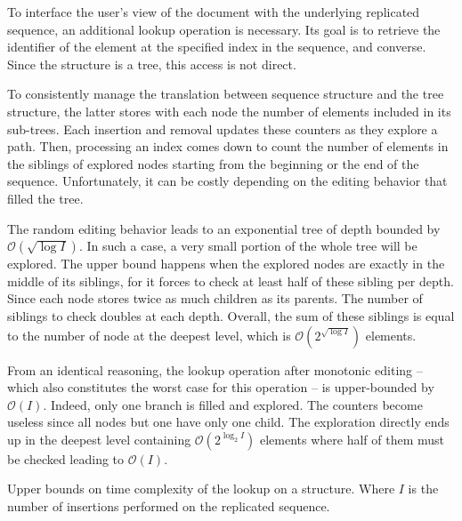 To interface the user's view of the document with the underlying replicated
sequence, an additional lookup operation is necessary. Its goal is to retrieve
the identifier of the element at the specified index in the sequence, and
converse. Since the structure is a tree, this access is not direct.

To consistently manage the translation between sequence structure and the tree
structure, the latter stores with each node the number of elements included in
its sub-trees. Each insertion and removal updates these counters as they explore
a path. Then, processing an index comes down to count the number of elements in
the siblings of explored nodes starting from the beginning or the end of the
sequence. Unfortunately, it can be costly depending on the editing behavior that
filled the tree.

The random editing behavior leads to an exponential tree of depth bounded by
$\mathcal{O}(\sqrt{\log I})$. In such a case, a very small portion of the whole
tree will be explored. The upper bound happens when the explored nodes are
exactly in the middle of its siblings, for it forces to check at least half of
these sibling per depth. Since each node stores twice as much children as its
parents. The number of siblings to check doubles at each depth. Overall, the sum
of these siblings is equal to the number of node at the deepest level, which is
$\mathcal{O}(2^{\sqrt{\log I}})$ elements. 

From an identical reasoning, the lookup operation after monotonic editing --
which also constitutes the worst case for this operation -- is upper-bounded by
$\mathcal{O}(I)$. Indeed, only one branch is filled and explored. The counters
become useless since all nodes but one have only one child. The exploration
directly ends up in the deepest level containing $\mathcal{O}(2^{\log_2 I})$
elements where half of them must be checked leading to
$\mathcal{O}(I)$.

\begin{table}
  \caption{\label{table:lseqlookup}
    Upper bounds on time complexity of the lookup on a \LSEQ structure.
    Where $I$ is the number of insertions performed on the replicated sequence.}
  \centering
  
\end{table}

